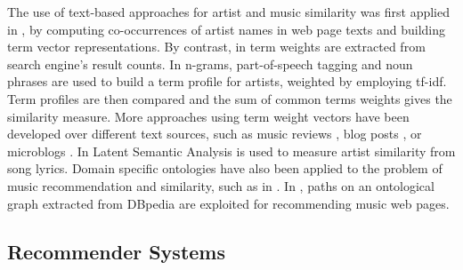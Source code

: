 The use of text-based approaches for artist and music similarity was first applied in \citep{Cohen2000}, by computing co-occurrences of artist names in web page texts and building term vector representations. By contrast, in \citep{Schedl2005} term weights are extracted from search engine's result counts. In \citep{Whitman2002} n-grams, part-of-speech tagging and noun phrases are used to build a term profile for artists, weighted by employing tf-idf. Term profiles are then compared and the sum of common terms weights gives the similarity measure. %
More approaches using term weight vectors have been developed over different text sources, such as music reviews \citep{Hu2005}, blog posts \citep{Celma2006}, or microblogs \citep{Schedl2013}.
In \citep{Logan2003} Latent Semantic Analysis is used to measure artist similarity from song lyrics. Domain specific ontologies have also been applied to the problem of music recommendation and similarity, such as in \citep{Celma2008}. In \citep{Leal2012}, paths on an ontological graph extracted from DBpedia are exploited for recommending music web pages. %


\subsection{Recommender Systems}
\label{sec:SOA:mir:recommendation}

